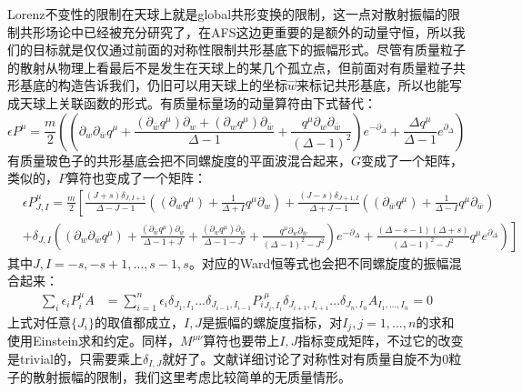 Lorenz不变性的限制在天球上就是global共形变换的限制，这一点对散射振幅的限制共形场论中已经被充分研究了，在AFS这边更重要的是额外的动量守恒，所以我们的目标就是仅仅通过前面的对称性限制共形基底下的振幅形式。尽管有质量粒子的散射从物理上看最后不是发生在天球上的某几个孤立点，但前面对有质量粒子共形基底的构造告诉我们，仍旧可以用天球上的坐标$\vec{w}$来标记共形基底，所以也能写成天球上关联函数的形式。有质量标量场的动量算符由下式替代：
\begin{equation}
	\epsilon P^\mu=\frac m2\left(\left(\partial_w\partial_{\bar{w}}q^\mu+\frac{(\partial_{\bar{w}}q^\mu)\partial_w+(\partial_wq^\mu)\partial_{\bar{w}}}{\Delta-1}+\frac{q^\mu\partial_w\partial_{\bar{w}}}{(\Delta-1)^2}\right)e^{-\partial_\Delta}+\frac{\Delta q^\mu}{\Delta-1}e^{\partial_\Delta}\right)
\end{equation}
有质量玻色子的共形基底会把不同螺旋度的平面波混合起来，$G$变成了一个矩阵，类似的，$P$算符也变成了一个矩阵：
\begin{equation}
	\begin{aligned}
		&\epsilon P_{J,I}^{\mu}=\frac{m}{2}\left[\frac{(J+s)\delta_{J,I+1}}{\Delta-J-1}\left(\left(\partial_{w}q^{\mu}\right)+\frac{1}{\Delta+I}q^{\mu}\partial_{w}\right)+\frac{(J-s)\delta_{J+1,I}}{\Delta+J-1}\left((\partial_{\bar{w}}q^{\mu})+\frac{1}{\Delta-I}q^{\mu}\partial_{\bar{w}}\right)\right.  \\
		&\left.\left.+\delta_{J,I}\left(\left(\partial_{w}\partial_{\bar{w}}q^{\mu}\right)+\frac{(\partial_{\bar{w}}q^{\mu})\partial_{w}}{\Delta-1+J}+\frac{(\partial_{w}q^{\mu})\partial_{\bar{w}}}{\Delta-1-J}+\frac{q^{\mu}\partial_{w}\partial_{\bar{w}}}{(\Delta-1)^{2}-J^{2}}\right)e^{-\partial_{\Delta}}+\frac{(\Delta-s-1)(\Delta+s)}{(\Delta-1)^{2}-J^{2}}q^{\mu}e^{\partial_{\Delta}}\right)\right]
	\end{aligned}
\end{equation}
其中$J,I=-s,-s+1,\ldots,s-1,s$。对应的Ward恒等式也会把不同螺旋度的振幅混合起来：
\begin{equation}
	\begin{aligned}\sum_i\epsilon_iP_i^\mu A&=\sum_{i=1}^n\epsilon_i\delta_{J_1,I_1}...\delta_{J_{i-1},I_{i-1}}P_i{}^\mu_{J_i,I_i}\delta_{J_{i+1},I_{i+1}}...\delta_{J_n,I_n}A_{I_1,...,I_n}=0\end{aligned}
\end{equation}
上式对任意$\{J_i\}$的取值都成立，$I,J$是振幅的螺旋度指标，对$I_j,j=1,\ldots,n$的求和使用Einstein求和约定。同样，$M^{\mu\nu}$算符也要带上$I,J$指标变成矩阵，不过它的改变是trivial的，只需要乘上$\delta_{I,J}$就好了。文献\cite{Law:2020tsg}详细讨论了对称性对有质量自旋不为0粒子的散射振幅的限制，我们这里考虑比较简单的无质量情形\cite{Law:2019glh}。
